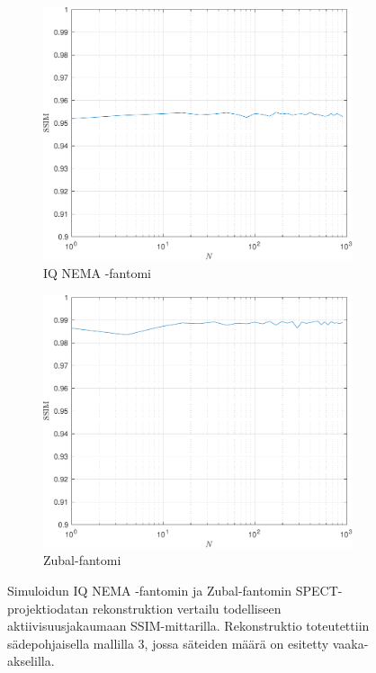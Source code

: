 \iffalse
\begin{figure}[H]
    \centering
    \captionsetup{width=.9\linewidth}
    \begin{subfigure}[t]{.4\textwidth}
        \includegraphics[width=\linewidth]{kuvat/nema_vertailu_SSIM.pdf}
        \caption{IQ NEMA -fantomi}
    \end{subfigure}%
    \hspace{.1\textwidth}%
    \begin{subfigure}[t]{.4\textwidth}
        \includegraphics[width=\linewidth]{kuvat/cbf_vertailu_SSIM.pdf}
        \caption{Zubal-fantomi}
    \end{subfigure}%
    \caption{Simuloidun IQ NEMA -fantomin ja Zubal-fantomin SPECT-projektiodatan rekonstruktion vertailu todelliseen aktiivisuusjakaumaan SSIM-mittarilla. Rekonstruktio toteutettiin sädepohjaisella mallilla 3, jossa säteiden määrä on esitetty vaaka-akselilla.}
    \label{fig:vertailu_SSIM}
\end{figure}
